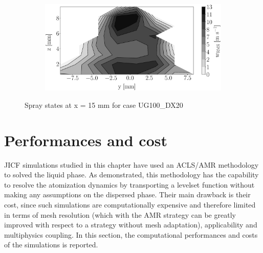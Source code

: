 \begin{figure}[h!]
\begin{subfigure}[b]{0.22\textwidth}
\end{subfigure}
   \hspace{0.17in}
\begin{subfigure}[b]{0.22\textwidth}
	\centering
   \includegraphics[scale=0.17]{./part2_developments/figures_ch5_resolved_JICF/injectors_SLI/uG100_dx20_x15_uz_rms_map.eps}
\end{subfigure}
\caption{Spray states at x = 15 mm for case UG100\_DX20}
\label{fig:injectors_sli_uG100_dx20_x15}
\end{figure}


\clearpage

\section{Performances and cost}
\label{subsec:ch5_computational_performances}

JICF simulations studied in this chapter have used an ACLS/AMR methodology to solved the liquid phase. As demonstrated, this methodology has the capability to resolve the atomization dynamics by transporting a levelset function without making any assumptions on the dispersed phase. Their main drawback is their cost, since such simulations are computationally expensive and therefore limited in terms of mesh resolution (which with the AMR strategy can be greatly improved with respect to a strategy without mesh adaptation), applicability and multiphysics coupling. In this section, the computational performances and costs of the simulations is reported. 

